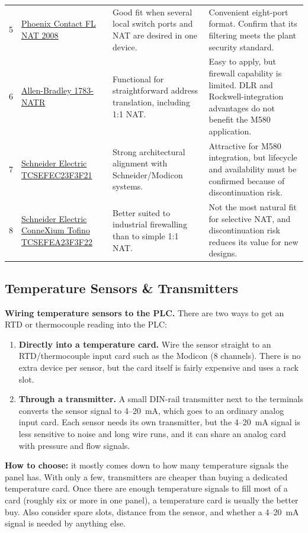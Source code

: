 \begin{footnotesize}
\begin{longtable}{@{}P{0.6cm}P{3.4cm}P{5.4cm}P{5.8cm}@{}}
5 & \href{https://www.phoenixcontact.com/en-us/products/nat-switch-fl-nat-2008-2702881}{Phoenix Contact FL NAT 2008} & Good fit when several local switch ports and NAT are desired in one device. & Convenient eight-port format. Confirm that its filtering meets the plant security standard. \\
6 & \href{https://www.rockwellautomation.com/en-us/products/hardware/allen-bradley/network-security-and-infrastructure/1783-natr.html}{Allen-Bradley 1783-NATR} & Functional for straightforward address translation, including 1:1 NAT. & Easy to apply, but firewall capability is limited. DLR and Rockwell-integration advantages do not benefit the M580 application. \\
7 & \href{https://www.se.com/ww/en/product/TCSEFEC23F3F21/}{Schneider Electric TCSEFEC23F3F21} & Strong architectural alignment with Schneider/Modicon systems. & Attractive for M580 integration, but lifecycle and availability must be confirmed because of discontinuation risk. \\
8 & \href{https://www.se.com/ww/en/product/TCSEFEA23F3F22/}{Schneider Electric ConneXium Tofino TCSEFEA23F3F22} & Better suited to industrial firewalling than to simple 1:1 NAT. & Not the most natural fit for selective NAT, and discontinuation risk reduces its value for new designs. \\
\bottomrule
\end{longtable}
\end{footnotesize}

\subsection{Temperature Sensors \& Transmitters}\label{sec:temperature}
\textbf{Wiring temperature sensors to the PLC.} There are two ways to get an RTD or thermocouple reading into the PLC:
\begin{enumerate}[itemsep=2pt]
  \item \textbf{Directly into a temperature card.} Wire the sensor straight to an RTD/thermocouple input card such as the Modicon  (8 channels). There is no extra device per sensor, but the card itself is fairly expensive and uses a rack slot.
  \item \textbf{Through a transmitter.} A small DIN-rail transmitter next to the terminals converts the sensor signal to 4--20~mA, which goes to an ordinary analog input card. Each sensor needs its own transmitter, but the 4--20~mA signal is less sensitive to noise and long wire runs, and it can share an analog card with pressure and flow signals.
\end{enumerate}
\textbf{How to choose:} it mostly comes down to how many temperature signals the panel has. With only a few, transmitters are cheaper than buying a dedicated temperature card. Once there are enough temperature signals to fill most of a card (roughly six or more in one panel), a temperature card is usually the better buy. Also consider spare slots, distance from the sensor, and whether a 4--20~mA signal is needed by anything else.

